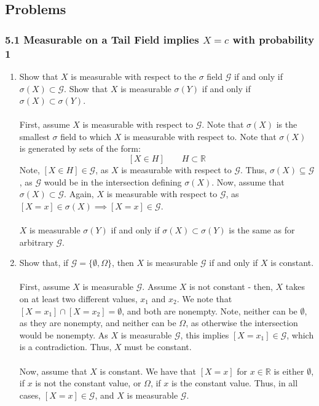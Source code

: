 \documentclass[12pt,a4paper]{article}
\newcommand{\1}[1]{\mathbbm{1}\left\{ #1 \right\}}
\newcommand{\R}{\mathbb{R}}
\newcommand{\gcal}{\mathcal{G}}
\begin{document}
\subsection{Problems}
\subsubsection{5.1 Measurable on a Tail Field implies $X = c$ with probability 1} 
\begin{enumerate}
	\item Show that $X$ is measurable with respect to the $\sigma$ field $\gcal$ if and only if $\sigma(X) \subset \gcal$. Show that $X$ is measurable $\sigma(Y)$ if and only if $\sigma(X) \subset \sigma(Y)$.
	\\\\
	First, assume $X$ is measurable with respect to $\gcal$. Note that $\sigma(X)$ is the smallest $\sigma$ field to which $X$ is measurable with respect to. Note that $\sigma(X)$ is generated by sets of the form:
	$$
		[X \in H] \quad\quad H \subset \R
	$$
	Note, $[X \in H] \in \gcal$, as $X$ is measurable with respect to $\gcal$. Thus, $\sigma(X) \subseteq \gcal$, as $\gcal$ would be in the intersection defining $\sigma(X)$. Now, assume that $\sigma(X) \subset \gcal$. Again, $X$ is measurable with respect to $\gcal$, as $[X = x] \in \sigma(X) \implies [X = x] \in \gcal$.
	\\\\
	$X$ is measurable $\sigma(Y)$ if and only if $\sigma(X) \subset \sigma(Y)$ is the same as for arbitrary $\gcal$.
	
	\item Show that, if $\gcal = \{\emptyset, \Omega\}$, then $X$ is measurable $\gcal$ if and only if $X$ is constant.
	\\\\
	First, assume $X$ is measurable $\gcal$. Assume $X$ is not constant - then, $X$ takes on at least two different values, $x_1$ and $x_2$. We note that $[X = x_1] \cap [X = x_2] = \emptyset$, and both are nonempty. Note, neither can be $\emptyset$, as they are nonempty, and neither can be $\Omega$, as otherwise the intersection would be nonempty. As $X$ is measurable $\gcal$, this implies $[X = x_1] \in \gcal$, which is a contradiction. Thus, $X$ must be constant.
	\\\\
	Now, assume that $X$ is constant. We have that $[X = x]$ for $x \in \R$ is either $\emptyset$, if $x$ is not the constant value, or $\Omega$, if $x$ is the constant value. Thus, in all cases, $[X = x] \in \gcal$, and $X$ is measurable $\gcal$.
	

\end{enumerate}
\end{document}
